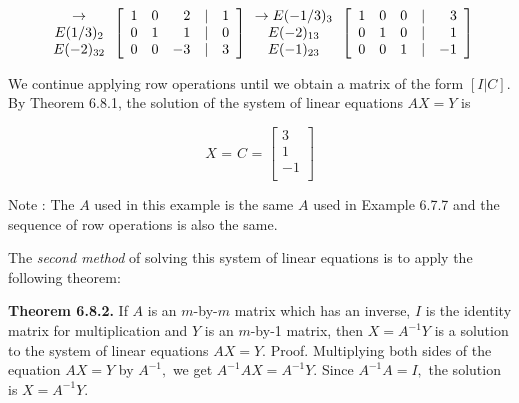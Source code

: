 \begin{large}
\begin{equation*}
\begin{array}{c}
\to\\
E(1/3)_{2}\\
E(-2)_{32}\\
\end{array}
\left[
\begin{array}{rrrcr}
1&0&2&|&1\\
0&1&1&|&0\\
0&0&-3&|&3\\
\end{array}
\right]
\begin{array}{c}
\to E(-1/3)_{3}\\
E(-2)_{13}\\
E(-1)_{23}\\
\end{array}
\left[
\begin{array}{rrrcr}
1&0&0&|&3\\
0&1&0&|&1\\
0&0&1&|&-1\\
\end{array}
\right]
\end{equation*}\nl

We continue applying row operations until we obtain a matrix of the form $[I | C].$\nl
By Theorem 6.8.1, the solution of the system of linear equations $AX =Y$ is \nl

\begin{equation*}
\textit{X = C =~}\left[
\begin{array}{r}
3\\
1\\
-1\\
\end{array}
\right]
\end{equation*}\nl

Note : The $A$ used in this example is the same $A$ used in Example 6.7.7 and the sequence of row operations
is also the same.\nl

The \textit{second method} of solving this system of linear equations is to apply the following theorem:\nl

\textbf{Theorem 6.8.2.}  If $A$ is an $m$-by-$m$ matrix which has an inverse, $I$ is the identity matrix for multiplication and $Y$ is an $m$-by-1 matrix, then $X = A^{-1}Y$ is a solution to the system of linear equations $AX = Y.$\nl
Proof.\nl
Multiplying both sides of the equation $AX = Y$ by $A^{-1},$ we get $A^{-1}AX = A^{-1}Y.$\nl
Since $A^{-1}A = I,$ the solution is $X = A^{-1}Y.$\nl


\end{large}

